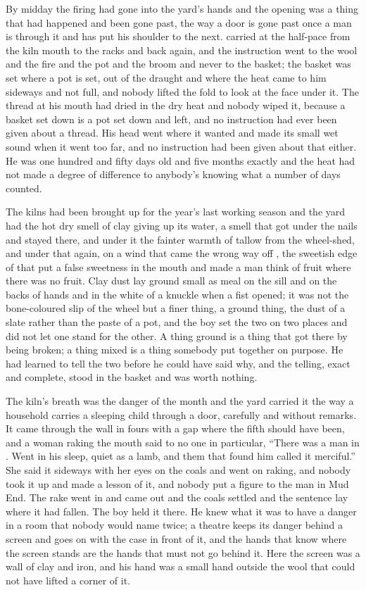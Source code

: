 By midday the firing had gone into the yard's hands and the opening was a thing that had happened and been gone past, the way a door is gone past once a man is through it and has put his shoulder to the next.  carried  at the half-pace from the kiln mouth to the racks and back again, and the instruction went to the wool and the fire and the pot and the broom and never to the basket; the basket was set where a pot is set, out of the draught and where the heat came to him sideways and not full, and nobody lifted the fold to look at the face under it. The thread at his mouth had dried in the dry heat and nobody wiped it, because a basket set down is a pot set down and left, and no instruction had ever been given about a thread. His head went where it wanted and made its small wet sound when it went too far, and no instruction had been given about that either. He was one hundred and fifty days old and five months exactly and the heat had not made a degree of difference to anybody's knowing what a number of days counted.

The kilns had been brought up for the year's last working season and the yard had the hot dry smell of clay giving up its water, a smell that got under the nails and stayed there, and under it the fainter warmth of tallow from the wheel-shed, and under that again, on a wind that came the wrong way off , the sweetish edge of  that put a false sweetness in the mouth and made a man think of fruit where there was no fruit. Clay dust lay ground small as meal on the sill and on the backs of hands and in the white of a knuckle when a fist opened; it was not the bone-coloured slip of the wheel but a finer thing, a ground thing, the dust of a slate rather than the paste of a pot, and the boy set the two on two places and did not let one stand for the other. A thing ground is a thing that got there by being broken; a thing mixed is a thing somebody put together on purpose. He had learned to tell the two before he could have said why, and the telling, exact and complete, stood in the basket and was worth nothing.

The kiln's breath was the danger of the month and the yard carried it the way a household carries a sleeping child through a door, carefully and without remarks. It came through the wall in fours with a gap where the fifth should have been, and a woman raking the mouth said to no one in particular, “There was a man in . Went in his sleep, quiet as a lamb, and them that found him called it merciful.” She said it sideways with her eyes on the coals and went on raking, and nobody took it up and made a lesson of it, and nobody put a figure to the man in Mud End. The rake went in and came out and the coals settled and the sentence lay where it had fallen. The boy held it there. He knew what it was to have a danger in a room that nobody would name twice; a theatre keeps its danger behind a screen and goes on with the case in front of it, and the hands that know where the screen stands are the hands that must not go behind it. Here the screen was a wall of clay and iron, and his hand was a small hand outside the wool that could not have lifted a corner of it.

